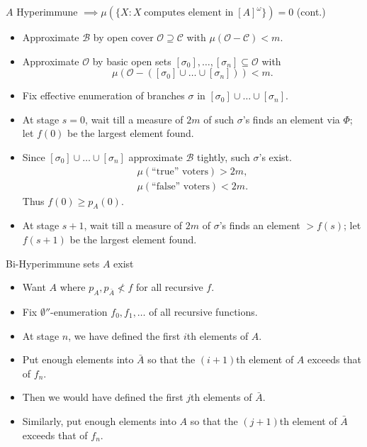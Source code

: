 \begin{frame}{$A$ Hyperimmune $\implies \mu(\{X: X\; \text{computes
element in}\; [A]^\omega\}) =0$ (cont.)}
  \begin{itemize}
    \item Approximate $\mathcal{B}$ by open cover
      $\mathcal{O}\supseteq\mathcal{C}$ with
      $\mu(\mathcal{O}-\mathcal{C})<m$.
    \item Approximate $\mathcal{O}$ by basic open sets
      $[\sigma_0],\ldots,[\sigma_n] \subseteq\mathcal{O}$ with
      \[\mu(\mathcal{O}-([\sigma_0]\cup\ldots\cup[\sigma_n])) <m.\]
    \item Fix effective enumeration of branches $\sigma$ in
      $[\sigma_0]\cup\ldots\cup[\sigma_n]$.
    \item At stage $s=0$, wait till a measure of $2m$ of such $\sigma$'s
      finds an element via $\Phi$; let $f(0)$ be the largest element found.
    \item Since $[\sigma_0]\cup\ldots\cup[\sigma_n]$ approximate $\mathcal{B}$
      tightly, such $\sigma$'s exist.
      \begin{align*}
        \mu(\text{``true'' voters})>2m,\\
        \mu(\text{``false'' voters})<2m.
      \end{align*}
      Thus $f(0)\geq p_A(0)$.
    \item At stage $s+1$, wait till a measure of $2m$ of $\sigma$'s
      finds an element $>f(s)$; let $f(s+1)$ be the largest
      element found.
  \end{itemize}
\end{frame}

\begin{frame}{Bi-Hyperimmune sets $A$ exist}
  \begin{itemize}
    \item Want $A$ where $p_A,p_{\bar{A}}\not<f$ for all recursive $f$.
    \item Fix $\emptyset''$-enumeration $f_0,f_1,\ldots$ of all recursive
      functions.
    \item At stage $n$, we have defined the first $i$th elements of $A$.
    \item Put enough elements into $\bar{A}$ so that the $(i+1)$th element
      of $A$ exceeds that of $f_n$.
    \item Then we would have defined the first $j$th elements of $\bar{A}$.
    \item Similarly, put enough elements into $A$ so that the $(j+1)$th
      element of $\bar{A}$ exceeds that of $f_n$.
  \end{itemize}
\end{frame}
